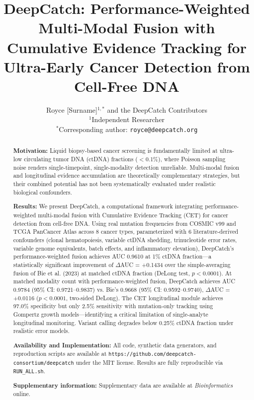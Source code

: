 \documentclass[10pt,a4paper]{article}
\title{\textbf{DeepCatch: Performance-Weighted Multi-Modal Fusion with Cumulative Evidence Tracking for Ultra-Early Cancer Detection from Cell-Free DNA}}
\author{
  Royce [Surname]$^{1,*}$ and the DeepCatch Contributors\\
  \small{$^{1}$Independent Researcher}\\
  \small{$^{*}$Corresponding author: \texttt{royce@deepcatch.org}}
}
\date{}
\begin{document}
\maketitle


\begin{abstract}
\textbf{Motivation:} Liquid biopsy-based cancer screening is fundamentally limited at ultra-low circulating tumor DNA (ctDNA) fractions ($<$0.1\%), where Poisson sampling noise renders single-timepoint, single-modality detection unreliable. Multi-modal fusion and longitudinal evidence accumulation are theoretically complementary strategies, but their combined potential has not been systematically evaluated under realistic biological confounders.

\textbf{Results:} We present DeepCatch, a computational framework integrating performance-weighted multi-modal fusion with Cumulative Evidence Tracking (CET) for cancer detection from cell-free DNA. Using real mutation frequencies from COSMIC v99 and TCGA PanCancer Atlas across 8 cancer types, parameterized with 6 literature-derived confounders (clonal hematopoiesis, variable ctDNA shedding, trinucleotide error rates, variable genome equivalents, batch effects, and inflammatory elevation), DeepCatch's performance-weighted fusion achieves AUC 0.9610 at 1\% ctDNA fraction—a statistically significant improvement of $\Delta$AUC = +0.1434 over the simple-averaging fusion of Bie et al. (2023) at matched ctDNA fraction (DeLong test, $p < 0.0001$). At matched modality count with performance-weighted fusion, DeepCatch achieves AUC 0.9784 (95\% CI: 0.9721--0.9837) vs. Bie's 0.9668 (95\% CI: 0.9592--0.9740), $\Delta$AUC = +0.0116 ($p < 0.0001$, two-sided DeLong). The CET longitudinal module achieves 97.0\% specificity but only 2.5\% sensitivity with mutation-only tracking using Gompertz growth models—identifying a critical limitation of single-analyte longitudinal monitoring. Variant calling degrades below 0.25\% ctDNA fraction under realistic error models.

\textbf{Availability and Implementation:} All code, synthetic data generators, and reproduction scripts are available at \texttt{https://github.com/deepcatch-consortium/deepcatch} under the MIT license. Results are fully reproducible via \texttt{RUN\_ALL.sh}.

\textbf{Supplementary information:} Supplementary data are available at \textit{Bioinformatics} online.
\end{abstract}
\end{document}
